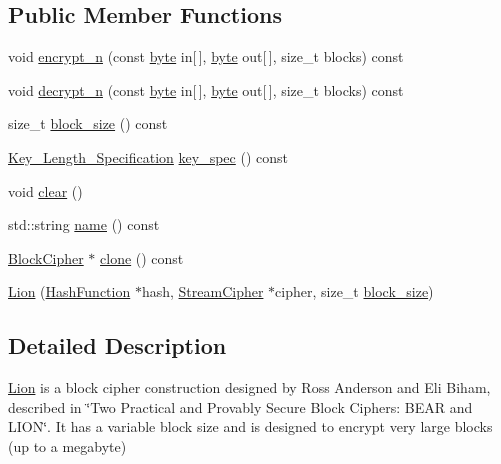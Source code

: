 \subsection*{Public Member Functions}
\begin{DoxyCompactItemize}
\item 
void \hyperlink{classBotan_1_1Lion_a7f88642fd810765c94d91770ed54f2de}{encrypt\-\_\-n} (const \hyperlink{namespaceBotan_a7d793989d801281df48c6b19616b8b84}{byte} in\mbox{[}$\,$\mbox{]}, \hyperlink{namespaceBotan_a7d793989d801281df48c6b19616b8b84}{byte} out\mbox{[}$\,$\mbox{]}, size\-\_\-t blocks) const 
\item 
void \hyperlink{classBotan_1_1Lion_a86f0d634887742dfddb4314c09664148}{decrypt\-\_\-n} (const \hyperlink{namespaceBotan_a7d793989d801281df48c6b19616b8b84}{byte} in\mbox{[}$\,$\mbox{]}, \hyperlink{namespaceBotan_a7d793989d801281df48c6b19616b8b84}{byte} out\mbox{[}$\,$\mbox{]}, size\-\_\-t blocks) const 
\item 
size\-\_\-t \hyperlink{classBotan_1_1Lion_ab7d58c2d256a6bdb3298ec1328c0b2df}{block\-\_\-size} () const 
\item 
\hyperlink{classBotan_1_1Key__Length__Specification}{Key\-\_\-\-Length\-\_\-\-Specification} \hyperlink{classBotan_1_1Lion_a9a1a3d0bb3b19990d92c5a88af9fde4e}{key\-\_\-spec} () const 
\item 
void \hyperlink{classBotan_1_1Lion_a553c10d9644f75adf0ea1efb39e1466b}{clear} ()
\item 
std\-::string \hyperlink{classBotan_1_1Lion_a5d12dd501a7a2720857957e666c33cac}{name} () const 
\item 
\hyperlink{classBotan_1_1BlockCipher}{Block\-Cipher} $\ast$ \hyperlink{classBotan_1_1Lion_a97f839af22f78eec46aabce8a540dfe7}{clone} () const 
\item 
\hyperlink{classBotan_1_1Lion_a1c0472de70c02a017560f800244a003d}{Lion} (\hyperlink{classBotan_1_1HashFunction}{Hash\-Function} $\ast$hash, \hyperlink{classBotan_1_1StreamCipher}{Stream\-Cipher} $\ast$cipher, size\-\_\-t \hyperlink{classBotan_1_1Lion_ab7d58c2d256a6bdb3298ec1328c0b2df}{block\-\_\-size})
\end{DoxyCompactItemize}


\subsection{Detailed Description}
\hyperlink{classBotan_1_1Lion}{Lion} is a block cipher construction designed by Ross Anderson and Eli Biham, described in \char`\"{}\-Two Practical and Provably Secure Block
\-Ciphers\-: B\-E\-A\-R and L\-I\-O\-N\char`\"{}. It has a variable block size and is designed to encrypt very large blocks (up to a megabyte)


